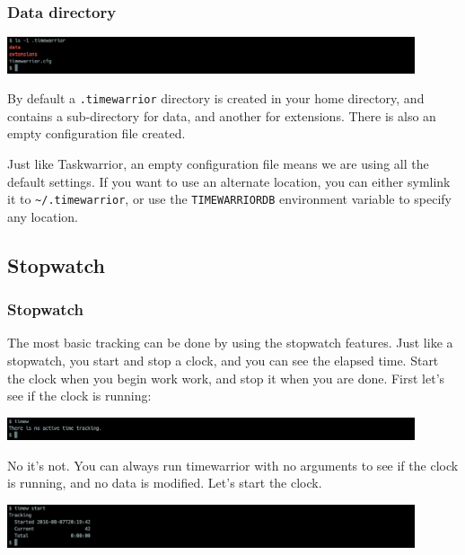 \documentclass[t,handout]{beamer}
\begin{document}
\begin{frame}[fragile]\frametitle{Data directory}
    \vfill
    \includegraphics[width=12cm]{images/tutorial2.png}

    By default a \verb=.timewarrior= directory is created in your home directory, and contains a sub-directory for data, and another for extensions. There is also an empty configuration file created.

    Just like Taskwarrior, an empty configuration file means we are using all the default settings. If you want to use an alternate location, you can either symlink it to \verb=~/.timewarrior=, or use the \verb=TIMEWARRIORDB= environment variable to specify any location.
\end{frame}

\subsection{Stopwatch}

\begin{frame}[fragile]\frametitle{Stopwatch}
    \vfill
    The most basic tracking can be done by using the stopwatch features. Just like a stopwatch, you start and stop a clock, and you can see the elapsed time. Start the clock when you begin work work, and stop it when you are done. First let's see if the clock is running:

    \includegraphics[width=12cm]{images/tutorial3.png}

    No it's not. You can always run timewarrior with no arguments to see if the clock is running, and no data is modified. Let's start the clock.

    \includegraphics[width=12cm]{images/tutorial4.png}
\end{frame}
\end{document}
